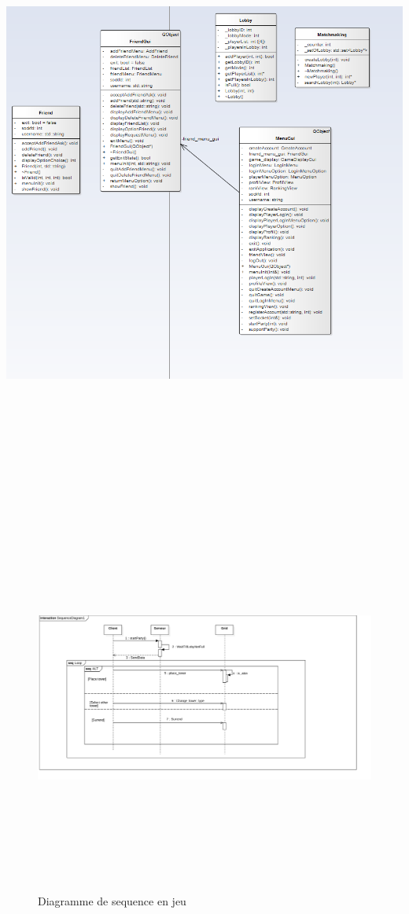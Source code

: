 \documentclass[12pt,a4paper]{article}
\begin{document}
  \includegraphics[height=20cm,width=20cm]{classDiagram5.png}


\newpage
\begin{figure}[H]
  \includegraphics[height=13cm,width=19cm]{SequenceINGAME.png} 
  \caption{Diagramme de sequence en jeu}
   \label{fig:picture}
 \end{figure}
\end{document}
